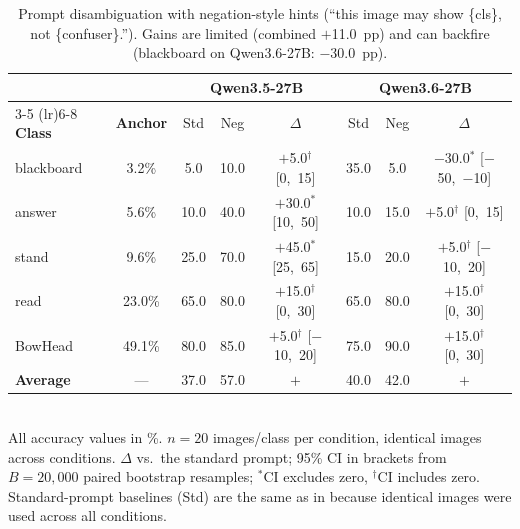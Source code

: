 \documentclass[a4paper,fleqn]{cas-sc}
\begin{document}
\begin{table}[t]
\caption{Prompt disambiguation with negation-style hints (``this image may show \{cls\}, not \{confuser\}.''). Gains are limited (combined $+$11.0~pp) and can backfire (blackboard on Qwen3.6-27B: $-$30.0~pp).}
\label{tab:prompt_opt_negation}
\centering
\footnotesize
\setlength{\tabcolsep}{3pt}
\begin{tabular}{lccccccc}
\toprule
& & \multicolumn{3}{c}{\textbf{Qwen3.5-27B}} & \multicolumn{3}{c}{\textbf{Qwen3.6-27B}} \\
\cmidrule(lr){3-5} \cmidrule(lr){6-8}
\textbf{Class} & \textbf{Anchor} & Std & Neg & $\Delta$ & Std & Neg & $\Delta$ \\
\midrule
blackboard & 3.2\% & 5.0 & 10.0 & $+$5.0$^\dagger$ [0,~15] & 35.0 & 5.0 & $-$30.0$^*$ [$-$50,~$-$10] \\
answer & 5.6\% & 10.0 & 40.0 & $+$30.0$^*$ [10,~50] & 10.0 & 15.0 & $+$5.0$^\dagger$ [0,~15] \\
stand & 9.6\% & 25.0 & 70.0 & $+$45.0$^*$ [25,~65] & 15.0 & 20.0 & $+$5.0$^\dagger$ [$-$10,~20] \\
read & 23.0\% & 65.0 & 80.0 & $+$15.0$^\dagger$ [0,~30] & 65.0 & 80.0 & $+$15.0$^\dagger$ [0,~30] \\
BowHead & 49.1\% & 80.0 & 85.0 & $+$5.0$^\dagger$ [$-$10,~20] & 75.0 & 90.0 & $+$15.0$^\dagger$ [0,~30] \\
\textbf{Average} & --- & 37.0 & 57.0 & \textbf{\boldmath$+$\unboldmath20.0} & 40.0 & 42.0 & \textbf{\boldmath$+$\unboldmath2.0} \\
\bottomrule
\end{tabular}
\\[2pt]
\footnotesize{All accuracy values in \%. $n=20$ images/class per condition, identical images across conditions. $\Delta$ vs.\ the standard prompt; 95\% CI in brackets from $B=20{,}000$ paired bootstrap resamples; $^*$CI excludes zero, $^\dagger$CI includes zero. Standard-prompt baselines (Std) are the same as in  because identical images were used across all conditions.}
\end{table}
\end{document}
